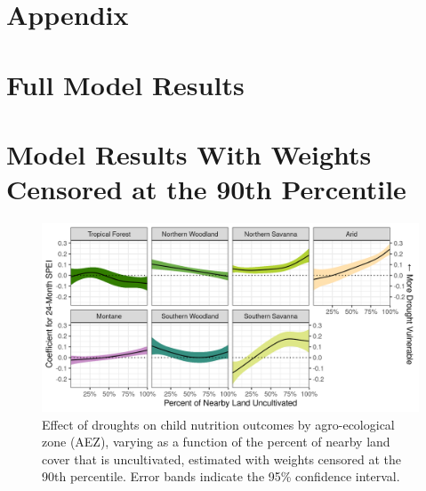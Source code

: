\documentclass{article}
\begin{document}



\setcounter{section}{0}
\renewcommand{\thetable}{A\arabic{section}}
\section*{Appendix} \label{AppendixA}
\setcounter{table}{0}
\setcounter{figure}{0}
\renewcommand{\thetable}{A\arabic{table}}
\renewcommand{\thefigure}{A\arabic{figure}}

\section{Full Model Results}


\newpage

\section{Model Results With Weights Censored at the 90th Percentile}
\begin{figure}[h!]
	\begin{center}
	\includegraphics[width=\linewidth]{AEZ_effects_q90.png}
	\end{center}
	\caption{Effect of droughts on child nutrition outcomes by agro-ecological zone (AEZ), varying as a function of the percent of nearby land cover that is uncultivated, estimated with weights censored at the 90th percentile.  Error bands indicate the 95\% confidence interval.}
\end{figure}



\newpage
\end{document}
